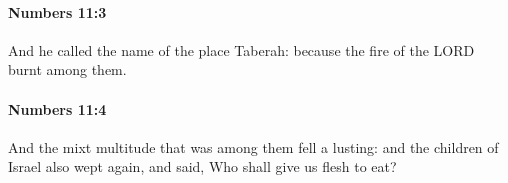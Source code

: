 		\paragraph{Numbers 11:3} %
			\label{NUMBERS-11-3}

			And he called the name of the place Taberah: because the fire of the LORD burnt among them.


		\paragraph{Numbers 11:4} %
			\label{NUMBERS-11-4}

			And the mixt multitude that was among them fell a lusting: and the children of Israel also wept again, and said, Who shall give us flesh to eat?


